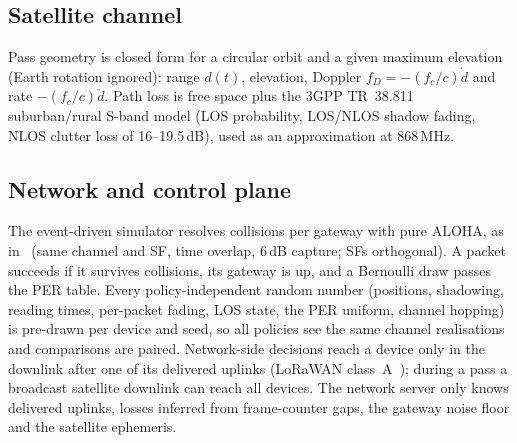 \subsection{Satellite channel}
Pass geometry is closed form for a circular orbit and a given maximum elevation (Earth rotation
ignored): range $d(t)$, elevation, Doppler $f_D=-(f_c/c)\dot d$ and rate $-(f_c/c)\ddot d$.
Path loss is free space plus the 3GPP TR~38.811~\cite{tr38811} suburban/rural S-band model
(LOS probability, LOS/NLOS shadow fading, NLOS clutter loss of 16--19.5\,dB), used as an
approximation at 868\,MHz.

\subsection{Network and control plane}
The event-driven simulator resolves collisions per gateway with pure ALOHA, as in~\cite{bor2016} (same channel and SF,
time overlap, 6\,dB capture; SFs orthogonal). A packet succeeds if it survives collisions, its
gateway is up, and a Bernoulli draw passes the PER table. Every policy-independent random number
(positions, shadowing, reading times, per-packet fading, LOS state, the PER uniform, channel
hopping) is pre-drawn per device and seed, so all policies see the same channel realisations and
comparisons are paired. Network-side decisions reach a device only in the downlink after one of its
delivered uplinks (LoRaWAN class~A~\cite{lorawan104}); during a pass a broadcast satellite downlink can reach all
devices. The network server only knows delivered uplinks, losses inferred from frame-counter gaps,
the gateway noise floor and the satellite ephemeris.
